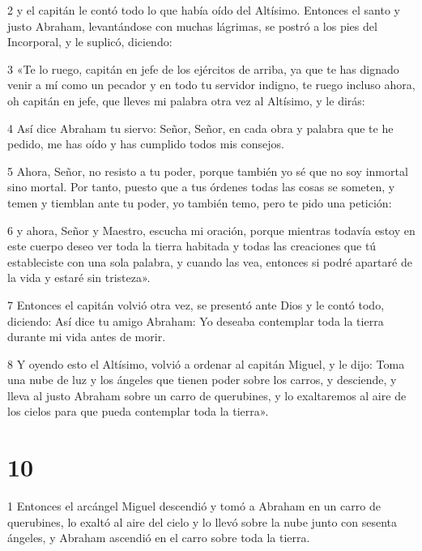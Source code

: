 \par 2 y el capitán le contó todo lo que había oído del Altísimo. Entonces el santo y justo Abraham, levantándose con muchas lágrimas, se postró a los pies del Incorporal, y le suplicó, diciendo:

\par 3 «Te lo ruego, capitán en jefe de los ejércitos de arriba, ya que te has dignado venir a mí como un pecador y en todo tu servidor indigno, te ruego incluso ahora, oh capitán en jefe, que lleves mi palabra otra vez al Altísimo, y le dirás:

\par 4 Así dice Abraham tu siervo: Señor, Señor, en cada obra y palabra que te he pedido, me has oído y has cumplido todos mis consejos.

\par 5 Ahora, Señor, no resisto a tu poder, porque también yo sé que no soy inmortal sino mortal. Por tanto, puesto que a tus órdenes todas las cosas se someten, y temen y tiemblan ante tu poder, yo también temo, pero te pido una petición:

\par 6 y ahora, Señor y Maestro, escucha mi oración, porque mientras todavía estoy en este cuerpo deseo ver toda la tierra habitada y todas las creaciones que tú estableciste con una sola palabra, y cuando las vea, entonces si podré apartaré de la vida y estaré sin tristeza».

\par 7 Entonces el capitán volvió otra vez, se presentó ante Dios y le contó todo, diciendo: Así dice tu amigo Abraham: Yo deseaba contemplar toda la tierra durante mi vida antes de morir.

\par 8 Y oyendo esto el Altísimo, volvió a ordenar al capitán Miguel, y le dijo: Toma una nube de luz y los ángeles que tienen poder sobre los carros, y desciende, y lleva al justo Abraham sobre un carro de querubines, y lo exaltaremos al aire de los cielos para que pueda contemplar toda la tierra».

\chapter{10}

\par 1 Entonces el arcángel Miguel descendió y tomó a Abraham en un carro de querubines, lo exaltó al aire del cielo y lo llevó sobre la nube junto con sesenta ángeles, y Abraham ascendió en el carro sobre toda la tierra.


